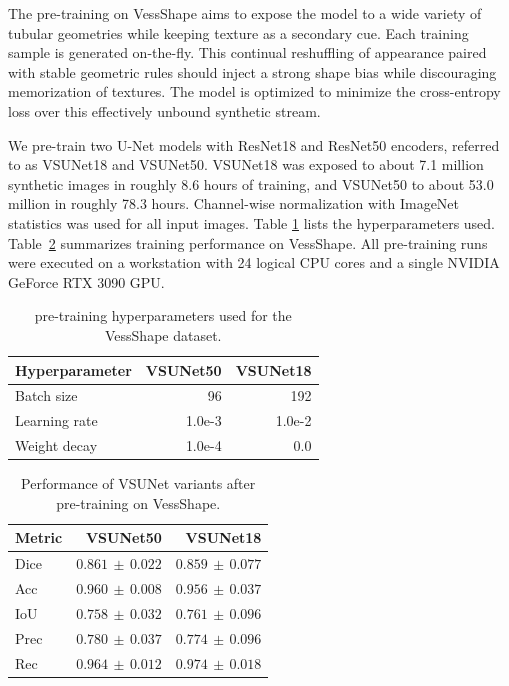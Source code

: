 \documentclass[%
reprint,
nofootinbib,
 amsmath,amssymb,
aps,
superscriptaddress,
showkeys,
longbibliography
]{revtex4-1}
\begin{document}
The pre-training on VessShape aims to expose the model to a wide variety of tubular geometries while keeping texture as a secondary cue. Each training sample is generated on-the-fly. This continual reshuffling of appearance paired with stable geometric rules should inject a strong shape bias while discouraging memorization of textures. The model is optimized to minimize the cross-entropy loss over this effectively unbound synthetic stream. 

We pre-train two U-Net models with ResNet18 and ResNet50 encoders, referred to as VSUNet18 and VSUNet50. VSUNet18 was exposed to about 7.1 million synthetic images in roughly 8.6 hours of training, and VSUNet50 to about 53.0 million in roughly 78.3 hours. Channel-wise normalization with ImageNet statistics was used for all input images. Table \ref{tab:vs_hparams} lists the hyperparameters used. Table~\ref{tab:vessshape_results} summarizes training performance on VessShape. All pre-training runs were executed on a workstation with 24 logical CPU cores and a single NVIDIA GeForce RTX 3090 GPU.

\begin{table}[t]
    \caption{pre-training hyperparameters used for the VessShape dataset.}
    \label{tab:vs_hparams}
    \centering
    \begingroup
    \small
    \setlength{\tabcolsep}{6pt}
    \renewcommand{\arraystretch}{1.15}
    \begin{tabular}{l r r}
        \hline
        	\textbf{Hyperparameter} & \textbf{VSUNet50} & \textbf{VSUNet18} \\
        \hline
        Batch size & 96 & 192 \\
        Learning rate & 1.0e-3 & 1.0e-2 \\
        Weight decay & 1.0e-4 & 0.0 \\
        \hline
    \end{tabular}
    \endgroup
\end{table}

\begin{table}[t]
    \caption{Performance of VSUNet variants after pre-training on VessShape.}
    \label{tab:vessshape_results}
    \centering
    \begingroup
    \small
    \setlength{\tabcolsep}{6pt}
    \renewcommand{\arraystretch}{1.15}
    \begin{tabular}{l r r}
        \hline
        	\textbf{Metric} & \textbf{VSUNet50} & \textbf{VSUNet18} \\
        \hline
        Dice & $0.861 \,\pm\, 0.022$ & $0.859 \,\pm\, 0.077$ \\
        Acc & $0.960 \,\pm\, 0.008$ & $0.956 \,\pm\, 0.037$ \\
        IoU & $0.758 \,\pm\, 0.032$ & $0.761 \,\pm\, 0.096$ \\
        Prec & $0.780 \,\pm\, 0.037$ & $0.774 \,\pm\, 0.096$ \\
        Rec & $0.964 \,\pm\, 0.012$ & $0.974 \,\pm\, 0.018$ \\
        \hline
    \end{tabular}
    \endgroup
\end{table}
\end{document}
